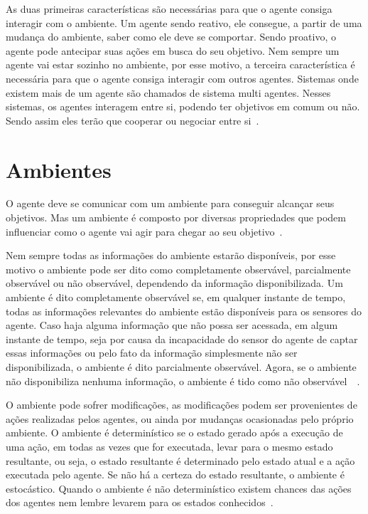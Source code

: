 As duas primeiras características são necessárias para que o agente consiga interagir com o ambiente. Um agente sendo reativo, ele consegue, a partir de uma mudança do ambiente, saber como ele deve se comportar. Sendo proativo, o agente pode antecipar suas ações em busca do seu objetivo.
Nem sempre um agente vai estar sozinho no ambiente, por esse motivo, a terceira característica é necessária para que o agente consiga interagir com outros agentes. Sistemas onde existem mais de um agente são chamados de sistema multi agentes. Nesses sistemas, os agentes interagem entre si, podendo ter objetivos em comum ou não. Sendo assim eles terão que cooperar ou negociar entre si~\cite[Capítulo 7]{intelligence2003modern}.

\section{Ambientes}

O agente deve se comunicar com um ambiente para conseguir alcançar seus objetivos. Mas um ambiente é composto por diversas propriedades que podem influenciar como o agente vai agir para chegar ao seu objetivo~\cite[Capítulo 2]{intelligence2003modern}. 

Nem sempre todas as informações do ambiente estarão disponíveis, por esse motivo o ambiente pode ser dito como completamente observável, parcialmente observável ou não observável, dependendo da informação disponibilizada. Um ambiente é dito completamente observável se, em qualquer instante de tempo, todas as informações relevantes do ambiente estão disponíveis para os sensores do agente. Caso haja alguma informação que não possa ser acessada, em algum instante de tempo, seja por causa da incapacidade do sensor do agente de captar essas informações ou pelo fato da informação simplesmente não ser disponibilizada, o ambiente é dito parcialmente observável. Agora, se o ambiente não disponibiliza nenhuma informação, o ambiente é tido como não observável~\cite[Capítulo 2]{intelligence2003modern}~\cite{agent1999}.   

O ambiente pode sofrer modificações, as modificações podem ser provenientes de ações realizadas pelos agentes, ou ainda por mudanças ocasionadas pelo próprio ambiente. O ambiente é determinístico se o estado gerado após a execução de uma ação, em todas as vezes que for executada, levar para o mesmo estado resultante, ou seja, o estado resultante é determinado pelo estado atual e a ação executada pelo agente. Se não há a certeza do estado resultante, o ambiente é estocástico. Quando o ambiente é não determinístico existem chances das ações dos agentes nem lembre levarem para os estados conhecidos~\cite[Capítulo 2]{intelligence2003modern}. 

